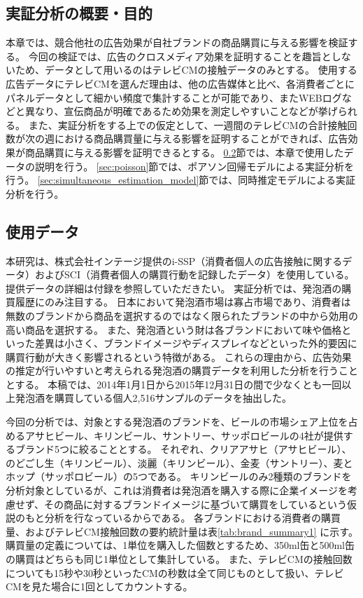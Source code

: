 \documentclass[11pt]{jsarticle}
\begin{document}
\subsection{実証分析の概要・目的}
\label{sec:empirical_summary}
本章では、競合他社の広告効果が自社ブランドの商品購買に与える影響を検証する。
今回の検証では、広告のクロスメディア効果を証明することを趣旨としないため、データとして用いるのはテレビCMの接触データのみとする。
使用する広告データにテレビCMを選んだ理由は、他の広告媒体と比べ、各消費者ごとにパネルデータとして細かい頻度で集計することが可能であり、またWEBログなどと異なり、宣伝商品が明確であるため効果を測定しやすいことなどが挙げられる。
また、実証分析をする上での仮定として、一週間のテレビCMの合計接触回数が次の週における商品購買量に与える影響を証明することができれば、広告効果が商品購買に与える影響を証明できるとする。
\ref{sec:empirical_data}節では、本章で使用したデータの説明を行う。
\ref{sec:poisson}節では、ポアソン回帰モデルによる実証分析を行う。
\ref{sec:simultaneous_estimation_model}節では、同時推定モデルによる実証分析を行う。

\subsection{使用データ}
\label{sec:empirical_data}
本研究は、株式会社インテージ提供のi-SSP（消費者個人の広告接触に関するデータ）およびSCI（消費者個人の購買行動を記録したデータ）を使用している。
提供データの詳細は付録を参照していただきたい。
実証分析では、発泡酒の購買履歴にのみ注目する。
日本において発泡酒市場は寡占市場であり、消費者は無数のブランドから商品を選択するのではなく限られたブランドの中から効用の高い商品を選択する。
また、発泡酒という財は各ブランドにおいて味や価格といった差異は小さく、ブランドイメージやディスプレイなどといった外的要因に購買行動が大きく影響されるという特徴がある。
これらの理由から、広告効果の推定が行いやすいと考えられる発泡酒の購買データを利用した分析を行うこととする。
本稿では、2014年1月1日から2015年12月31日の間で少なくとも一回以上発泡酒を購買している個人2,516サンプルのデータを抽出した。

今回の分析では、対象とする発泡酒のブランドを、ビールの市場シェア上位を占めるアサヒビール、キリンビール、サントリー、サッポロビールの4社が提供するブランド5つに絞ることとする。
それぞれ、クリアアサヒ（アサヒビール）、のどごし生（キリンビール）、淡麗（キリンビール）、金麦（サントリー）、麦とホップ（サッポロビール）の5つである。
キリンビールのみ2種類のブランドを分析対象としているが、これは消費者は発泡酒を購入する際に企業イメージを考慮せず、その商品に対するブランドイメージに基づいて購買をしているという仮説のもと分析を行なっているからである。
各ブランドにおける消費者の購買量、およびテレビCM接触回数の要約統計量は表\ref{tab:brand_summary1} に示す。
購買量の定義については、1単位を購入した個数とするため、350ml缶と500ml缶の購買はどちらも同じ1単位として集計している。
また、テレビCMの接触回数についても15秒や30秒といったCMの秒数は全て同じものとして扱い、テレビCMを見た場合に1回としてカウントする。
\end{document}
